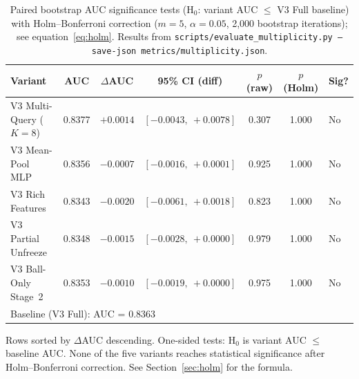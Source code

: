 \begin{table}[h]
\centering
\caption{Paired bootstrap AUC significance tests (H$_0$: variant AUC $\leq$ V3 Full baseline) with Holm--Bonferroni correction ($m=5$, $\alpha=0.05$, 2{,}000 bootstrap iterations); see equation~\eqref{eq:holm}. Results from \texttt{scripts/evaluate\_multiplicity.py --save-json metrics/multiplicity.json}.}
\begin{tabular}{lcccccl}
\toprule
\textbf{Variant} & \textbf{AUC} & \textbf{$\Delta$AUC} & \textbf{95\% CI (diff)} & \textbf{$p$ (raw)} & \textbf{$p$ (Holm)} & \textbf{Sig?} \\
\midrule
V3 Multi-Query ($K{=}8$) & 0.8377 & $+0.0014$ & $[-0.0043,\ +0.0078]$ & 0.307 & 1.000 & No \\
V3 Mean-Pool MLP         & 0.8356 & $-0.0007$ & $[-0.0016,\ +0.0001]$ & 0.925 & 1.000 & No \\
V3 Rich Features         & 0.8343 & $-0.0020$ & $[-0.0061,\ +0.0018]$ & 0.823 & 1.000 & No \\
V3 Partial Unfreeze      & 0.8348 & $-0.0015$ & $[-0.0028,\ +0.0000]$ & 0.979 & 1.000 & No \\
V3 Ball-Only Stage~2     & 0.8353 & $-0.0010$ & $[-0.0019,\ +0.0000]$ & 0.975 & 1.000 & No \\
\midrule
\multicolumn{7}{l}{\small Baseline (V3 Full): AUC = 0.8363} \\
\bottomrule
\end{tabular}
\begin{minipage}{\linewidth}
\vspace{4pt}
\footnotesize
Rows sorted by $\Delta$AUC descending. One-sided tests: H$_0$ is variant AUC $\leq$ baseline AUC. None of the five variants reaches statistical significance after Holm--Bonferroni correction. See Section~\ref{sec:holm} for the formula.
\end{minipage}
\label{tab:multiplicity}
\end{table}

